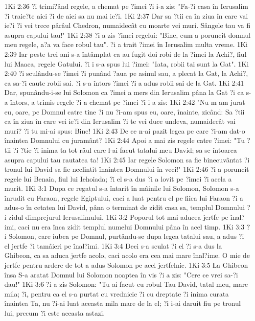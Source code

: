 1Ki 2:36  ?i trimi?ând regele, a chemat pe ?imei ?i i-a zis: "Fa-?i casa în Ierusalim ?i traie?te aici ?i de aici sa nu mai ie?i.
1Ki 2:37  Dar sa ?tii ca în ziua în care vai ie?i ?i vei trece pârâul Chedron, numaidecât cu moarte vei muri. Sângele tau va fi asupra capului tau!"
1Ki 2:38  ?i a zis ?imei regelui: "Bine, cum a poruncit domnul meu regele, a?a va face robul tau". ?i a trait ?imei în Ierusalim multa vreme.
1Ki 2:39  Iar peste trei ani s-a întâmplat ca au fugit doi robi de la ?imei la Achi?, fiul lui Maaca, regele Gatului. ?i i s-a spus lui ?imei: "Iata, robii tai sunt la Gat".
1Ki 2:40  ?i sculându-se ?imei ?i punând ?aua pe asinul sau, a plecat la Gat, la Achi?, ca sa-?i caute robii sai. ?i s-a întors ?imei ?i a adus robii sai de la Gat.
1Ki 2:41  Dar, spunându-i-se lui Solomon ca ?imei a mers din Ierusalim pâna la Gat ?i ca s-a întors, a trimis regele ?i a chemat pe ?imei ?i i-a zis:
1Ki 2:42  "Nu m-am jurat eu, oare, pe Domnul catre tine ?i nu ?i-am spus eu, oare, înainte, zicând: Sa ?tii ca în ziua în care vei ie?i din Ierusalim ?i te vei duce undeva, numaidecât vai muri? ?i tu mi-ai spus: Bine!
1Ki 2:43  De ce n-ai pazit legea pe care ?i-am dat-o înaintea Domnului cu juramânt?
1Ki 2:44  Apoi a mai zis regele catre ?imei: "Tu ?tii ?i ?tie ?i inima ta tot râul care l-ai facut tatalui meu David; sa se întoarca asupra capului tau rautatea ta!
1Ki 2:45  Iar regele Solomon sa fie binecuvântat ?i tronul lui David sa fie neclintit înaintea Domnului în veci!"
1Ki 2:46  ?i a poruncit regele lui Benaia, fiul lui Iehoiada; ?i el s-a dus ?i a lovit pe ?imei ?i acela a murit.
1Ki 3:1  Dupa ce regatul s-a întarit în mâinile lui Solomon, Solomon s-a înrudit cu Faraon, regele Egiptului, caci a luat pentru el pe fiica lui Faraon ?i a adus-o în cetatea lui David, pâna o terminat de zidit casa sa, templul Domnului ?i zidul dimprejurul Ierusalimului.
1Ki 3:2  Poporul tot mai aducea jertfe pe înal?imi, caci nu era înca zidit templul numelui Domnului pâna în acel timp.
1Ki 3:3  ?i Solomon, care iubea pe Domnul, purtându-se dupa legea tatalui sau, a adus ?i el jertfe ?i tamâieri pe înal?imi.
1Ki 3:4  Deci s-a sculat ?i el ?i s-a dus la Ghibeon, ca sa aduca jertfe acolo, caci acolo era cea mai mare înal?ime. O mie de jertfe pentru ardere de tot a adus Solomon pe acel jertfelnic.
1Ki 3:5  La Ghibeon însa S-a aratat Domnul lui Solomon noaptea în vis ?i a zis: "Cere ce vrei sa-?i dau!"
1Ki 3:6  ?i a zis Solomon: "Tu ai facut cu robul Tau David, tatal meu, mare mila; ?i, pentru ca el s-a purtat cu vrednicie ?i cu dreptate ?i inima curata înaintea Ta, nu ?i-ai luat aceasta mila mare de la el; ?i i-ai daruit fiu pe tronul lui, precum ?i este aceasta astazi.
